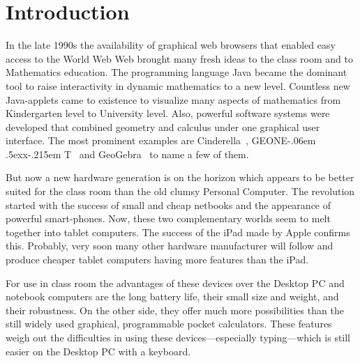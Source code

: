 \documentclass[12pt,a4paper]{article}%
\def\GEONExT{GEONE\kern-.06em \lower.5ex\hbox{x}\kern-.215em T}
\begin{document}
\thispagestyle{fancy}                                     %
%
%



\section{Introduction}
In the late 1990s the availability of graphical web browsers that enabled easy access to the World Web Web 
brought many fresh ideas to the class room and to Mathematics education. 
The programming language Java became the dominant tool to raise interactivity in 
dynamic mathematics to a new level. Countless new Java-applets came to existence 
to visualize many aspects of mathematics from Kindergarten level to University level. 
Also, powerful software systems were developed that combined geometry and calculus 
under one graphical user interface. The most prominent examples are 
Cinderella~\cite{kortenkamp1999}, \GEONExT~\cite{ehmann2003} and GeoGebra~\cite{hohenwarter2005} to name a few of them.

But now a new hardware generation is on the horizon which appears to be better suited 
for the class room than the old clumsy Personal Computer. 
The revolution started with the success of small and cheap netbooks and the appearance of 
powerful smart-phones. 
Now, these two complementary worlds seem to melt together into tablet computers. 
The success of the iPad made by Apple confirms this. 
Probably, very soon many other hardware manufacturer will follow and produce 
cheaper tablet computers having more features than the iPad.

For use in class room the advantages of these devices over the Desktop PC and notebook
computers are the long battery life, their small size and weight, and their robustness.
On the other side, they offer much more possibilities than the still widely used graphical, 
programmable pocket calculators. 
These features weigh out the difficulties in using these devices---especially typing---which 
is still easier on the Desktop PC with a keyboard.
\end{document}
